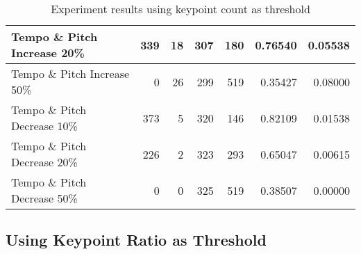\begin{table}[H]
\begin{tabular}{|l|r|r|r|r|r|r|}
        Tempo \& Pitch Increase 20\% & 339         & 18          & 307         & 180         & 0.76540           & 0.05538          \\ \hline
        Tempo \& Pitch Increase 50\% & 0           & 26          & 299         & 519         & 0.35427           & 0.08000          \\ \hline
        Tempo \& Pitch Decrease 10\% & 373         & 5           & 320         & 146         & 0.82109           & 0.01538          \\ \hline
        Tempo \& Pitch Decrease 20\% & 226         & 2           & 323         & 293         & 0.65047           & 0.00615          \\ \hline
        Tempo \& Pitch Decrease 50\% & 0           & 0           & 325         & 519         & 0.38507           & 0.00000          \\ \hline
    \end{tabular}
    \caption{Experiment results using keypoint count as threshold}
    \label{tab:test_results_keypoint}
\end{table}


\subsection{Using Keypoint Ratio as Threshold}


